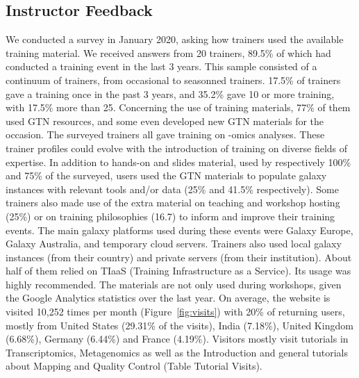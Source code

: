 \documentclass[10pt,letterpaper]{article}
\begin{document}
\subsection*{Instructor Feedback}

We conducted a survey in January 2020, asking how trainers used the available training material. We received answers from 20 trainers, 89.5\% of which had conducted a training event in the last 3 years.
This sample consisted of a continuum of trainers, from occasional to seasonned trainers. 17.5\% of trainers gave a training once in the past 3 years, and 35.2\% gave 10 or more training, with 17.5\% more than 25.
Concerning the use of training materials, 77\% of them used GTN resources, and some even developed new GTN materials for the occasion. The surveyed trainers all gave training on -omics analyses.
These trainer profiles could evolve with the introduction of training on diverse fields of expertise. In addition to hands-on and slides material, used by respectively 100\% and 75\% of the surveyed, users used the GTN materials to populate galaxy instances with relevant tools and/or data (25\% and 41.5\% respectively).
Some trainers also made use of the extra material on teaching and workshop hosting (25\%) or on training philosophies (16.7) to inform and improve their training events.
The main galaxy platforms used during these events were Galaxy Europe, Galaxy  Australia, and temporary cloud servers. Trainers also used local galaxy instances (from their country) and  private servers (from their institution).
About half of them relied on TIaaS (Training Infrastructure as a Service). Its usage was highly recommended.
The materials are not only used during workshops, given the Google Analytics statistics over the last year.
On average, the website is visited 10,252 times per month (Figure~\ref{fig:visits}) with 20\% of returning users, mostly from United States (29.31\% of the visits), India (7.18\%), United Kingdom (6.68\%), Germany (6.44\%) and France (4.19\%). Visitors mostly visit tutorials in Transcriptomics, Metagenomics as well as the Introduction and general tutorials about Mapping and Quality Control (Table Tutorial Visits).
\end{document}
